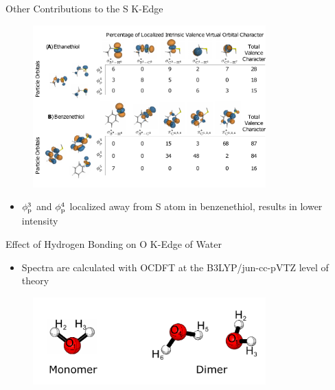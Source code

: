 \documentclass[t]{beamer}
\begin{document}
\begin{frame}{Other Contributions to the S K-Edge}
\begin{figure}
\centering
\includegraphics[width=0.8\textwidth]{other_livvo_contributions.pdf}
\end{figure}
\begin{itemize}
\item $\phi^3_{\rm p}$ and $\phi^4_{\rm p}$ localized away from S atom in benzenethiol, results in lower intensity
\end{itemize}
\end{frame}

\begin{frame}{Effect of Hydrogen Bonding on O K-Edge of Water}
\begin{itemize}
\item Spectra are calculated with OCDFT at the B3LYP/jun-cc-pVTZ level of theory
\end{itemize}
\begin{figure}
\includegraphics[width=0.8\textwidth]{water_monomer_dimer_header.pdf}
\end{figure}
\end{frame}
\end{document}
